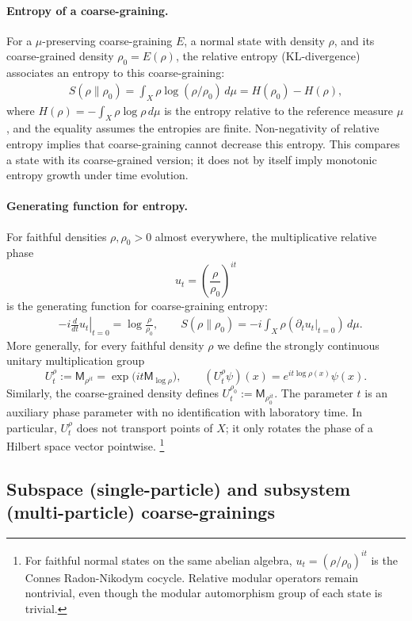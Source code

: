 \documentclass[a4paper,11pt]{article}
\theoremstyle{definition}
\theoremstyle{remark}
\newcommand{\Mop}{\mathsf{M}}
\begin{document}
\paragraph{Entropy of a coarse-graining.}
For a $\mu$-preserving coarse-graining $E$, a normal state with density $\rho$, and
its coarse-grained density $\rho_0=E(\rho)$, the relative entropy (KL-divergence)
associates an entropy to this coarse-graining:
\begin{align}
    S(\rho\|\rho_0)=\int_X \rho \log(\rho/\rho_0)\,d\mu=H(\rho_0)-H(\rho),
\end{align}
where $H(\rho)=-\int_X\rho\log\rho\,d\mu$ is the entropy relative to the reference
measure $\mu$, and the equality assumes the entropies are finite.  Non-negativity of
relative entropy implies that coarse-graining cannot decrease this entropy.  This
compares a state with its coarse-grained version; it does not by itself imply monotonic
entropy growth under time evolution.
 
\paragraph{Generating function for entropy.}
For faithful densities $\rho,\rho_0>0$ almost everywhere, the multiplicative relative
phase
\[
u_t = \left(\frac{\rho}{\rho_0}\right)^{it}
\]
is the generating function for coarse-graining entropy:
\begin{align}
&-i\left.\frac{d}{dt}u_t\right|_{t=0} = \log\frac{\rho}{\rho_0},\qquad
S(\rho\|\rho_0)=-i \int_X \rho (\partial_t u_t\big|_{t=0})\,d\mu.
\end{align}
More generally, for every faithful density $\rho$ we define the strongly continuous
unitary multiplication group
\[
  U_t^\rho:=\Mop_{\rho^{it}}
  =\exp\!\bigl(it\Mop_{\log\rho}\bigr),
  \qquad
  (U_t^\rho\psi)(x)=e^{it\log\rho(x)}\psi(x).
\]
Similarly, the coarse-grained density defines $U_t^{\rho_0}:=\Mop_{\rho_0^{it}}$.
The parameter $t$ is an auxiliary phase parameter with no identification with laboratory
time.  In particular, $U_t^\rho$ does not transport points of $X$; it only rotates the
phase of a Hilbert space vector pointwise.%
\footnote{For faithful normal states on the same abelian algebra,
  $u_t=(\rho/\rho_0)^{it}$ is the Connes Radon-Nikodym cocycle.  Relative modular
  operators remain nontrivial, even though the modular automorphism group of each state
  is trivial.}
 
\subsection{Subspace (single-particle) and subsystem (multi-particle) coarse-grainings}
\label{subsec:classical-region-subsystem}
 
\end{document}
